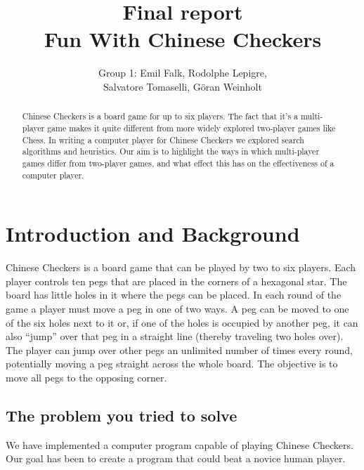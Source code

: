 \documentclass[a4paper,11pt]{article}
\begin{document}
\title{Final report\\Fun With Chinese Checkers}
\author{Group 1: Emil Falk, Rodolphe Lepigre,\\
        Salvatore Tomaselli, G\"oran Weinholt}
\maketitle
\begin{abstract}\centering
Chinese Checkers is a board game for up to six players. The fact that
it's a multi-player game makes it quite different from more widely
explored two-player games like Chess. In writing a computer player for
Chinese Checkers we explored search algorithms and heuristics. Our aim
is to highlight the ways in which multi-player games differ from
two-player games, and what effect this has on the effectiveness of a
computer player.
\end{abstract}

\section{Introduction and Background}
Chinese Checkers is a board game that can be played by two to six players.
Each player controls ten pegs that are placed in the corners of a
hexagonal star. The board has little holes in it where the pegs can be
placed. In each round of the game a player must move a peg in one of
two ways. A peg can be moved to one of the six holes next to it or, if
one of the holes is occupied by another peg, it can also ``jump'' over
that peg in a straight line (thereby traveling two holes over). The
player can jump over other pegs an unlimited number of times every
round, potentially moving a peg straight across the whole board. The
objective is to move all pegs to the opposing corner.

\subsection{The problem you tried to solve}
We have implemented a computer program capable of playing Chinese
Checkers. Our goal has been to create a program that could beat a
novice human player.
\end{document}
